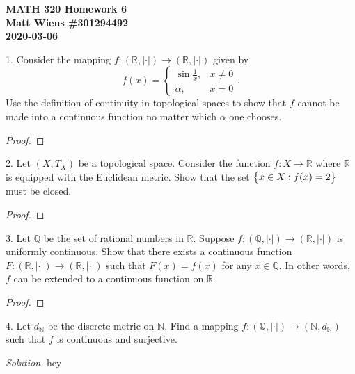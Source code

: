 \documentclass{article}
\newcommand{\N}{\mathbb{N}}
\newcommand{\Q}{\mathbb{Q}}
\newcommand{\R}{\mathbb{R}}
\begin{document}
\textbf{MATH 320 Homework 6} \\
\textbf{Matt Wiens \#301294492} \\
\textbf{2020-03-06}

1. Consider the mapping $f: (\R, |\cdot|) \to (\R, |\cdot|)$ given by
%
\begin{equation*}
   f(x)
    = \begin{cases}
        \sin \frac{1}{x}, & x \neq 0 \\
        \alpha, & x = 0
   \end{cases}
   .
\end{equation*}
%
Use the definition of continuity in topological spaces to show that $f$
cannot be made into a continuous function no matter which $\alpha$ one
chooses.

\begin{proof}

\end{proof}

\newpage

2. Let $(X, T_X)$ be a topological space. Consider the function $f: X
   \to \R$ where $\R$ is equipped with the Euclidean metric. Show that
   the set $\cbr{x \in X : f(x) = 2}$ must be closed.

\begin{proof}

\end{proof}

\newpage

3. Let $\Q$ be the set of rational numbers in $\R$. Suppose $f: (\Q,
   |\cdot|) \to (\R, |\cdot|)$ is uniformly continuous. Show that there
   exists a continuous function $F: (\R, |\cdot|) \to (\R, |\cdot|)$
   such that $F(x) = f(x)$ for any $x \in \mathbb{Q}$. In other words,
   $f$ can be extended to a continuous function on $\R$.

\begin{proof}

\end{proof}

\newpage

4. Let $d_\N$ be the discrete metric on $\N$. Find a mapping $f: (\Q,
   |\cdot|) \to (\N, d_\N)$ such that $f$ is continuous and surjective.

\textit{Solution.}
hey
\end{document}
